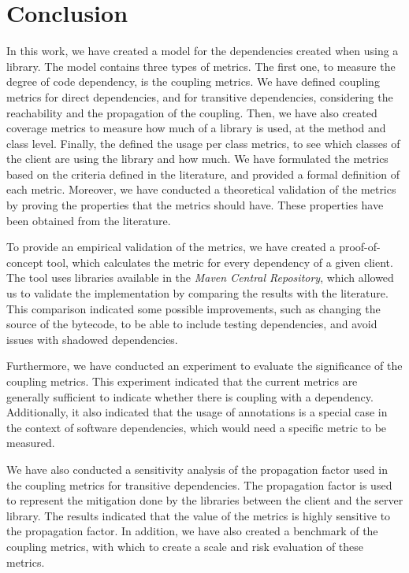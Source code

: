 \chapter{Conclusion}\label{ch:Conclusion}

In this work, we have created a model for the dependencies created when using a library. The model contains three types of metrics. The first one, to measure the degree of code dependency, is the coupling metrics. We have defined coupling metrics for direct dependencies, and for transitive dependencies, considering the reachability and the propagation of the coupling. Then, we have also created coverage metrics to measure how much of a library is used, at the method and class level. Finally, the defined the usage per class metrics, to see which classes of the client are using the library and how much. We have formulated the metrics based on the criteria defined in the literature, and provided a formal definition of each metric. Moreover, we have conducted a theoretical validation of the metrics by proving the properties that the metrics should have. These properties have been obtained from the literature.

To provide an empirical validation of the metrics, we have created a proof-of-concept tool, which calculates the metric for every dependency of a given client. The tool uses libraries available in the \textit{Maven Central Repository}, which allowed us to validate the implementation by comparing the results with the literature. This comparison indicated some possible improvements, such as changing the source of the bytecode, to be able to include testing dependencies, and avoid issues with shadowed dependencies.

Furthermore, we have conducted an experiment to evaluate the significance of the coupling metrics. This experiment indicated that the current metrics are generally sufficient to indicate whether there is coupling with a dependency. Additionally, it also indicated that the usage of annotations is a special case in the context of software dependencies, which would need a specific metric to be measured.

We have also conducted a sensitivity analysis of the propagation factor used in the coupling metrics for transitive dependencies. The propagation factor is used to represent the mitigation done by the libraries between the client and the server library. The results indicated that the value of the metrics is highly sensitive to the propagation factor. In addition, we have also created a benchmark of the coupling metrics, with which to create a scale and risk evaluation of these metrics.

